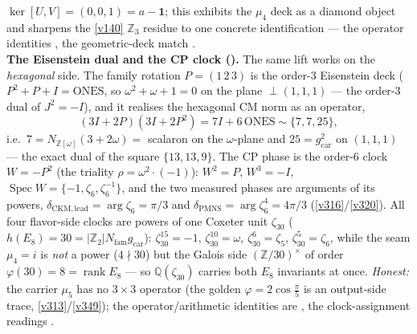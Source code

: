 \documentclass[11pt,a4paper]{article}
\newcommand{\gcar}{g_{\mathrm{car}}}
\newcommand{\Nfam}{N_{\mathrm{fam}}}
\newcommand{\Z}{\mathbb{Z}}
\theoremstyle{definition}
\begin{document}
\begin{keybox}
$\ker[U,V]=(0,0,1)=a-\mathbf 1$; this exhibits the $\mu_4$ deck as a diamond object and sharpens the
\vref{v140} $\Z_3$ residue to one concrete identification --- the operator identities \mE, the
geometric-deck match \mC.
\smallskip\\
\noindent\textbf{The Eisenstein dual and the CP clock ().}
The same lift works on the \emph{hexagonal} side. The family rotation $P=(1\,2\,3)$ is the order-$3$
Eisenstein deck ($P^2+P+I=\mathrm{ONES}$, so $\omega^2+\omega+1=0$ on the plane $\perp(1,1,1)$ --- the
order-$3$ dual of $J^2=-I$), and it realises the hexagonal CM norm as an operator,
\[
  (3I+2P)(3I+2P^2)=7I+6\,\mathrm{ONES}\sim\{7,7,25\},
\]
i.e.\ $7=N_{\Z[\omega]}(3{+}2\omega)=$ scalaron on the $\omega$-plane and $25=\gcar^2$ on $(1,1,1)$ ---
the exact dual of the square $\{13,13,9\}$. The CP phase is the order-$6$ clock $W=-P^2$ (the triality
$\rho=\omega^2{\cdot}({-}1)$): $W^2=P$, $W^3=-I$, $\operatorname{Spec}W=\{-1,\zeta_6,\zeta_6^{-1}\}$, and the
two measured phases are arguments of its powers, $\delta_{\mathrm{CKM,lead}}=\arg\zeta_6=\pi/3$ and
$\delta_{\mathrm{PMNS}}=\arg\zeta_6^4=4\pi/3$ (\vref{v316}/\vref{v320}). All four flavor-side clocks are
powers of one Coxeter unit $\zeta_{30}$ ($h(E_8)=30=|\Z_2|\Nfam\gcar$): $\zeta_{30}^{15}=-1$,
$\zeta_{30}^{10}=\omega$, $\zeta_{30}^{6}=\zeta_5$, $\zeta_{30}^{5}=\zeta_6$, while the seam $\mu_4=i$ is
\emph{not} a power ($4\nmid30$) but the Galois side $(\Z/30)^\times$ of order
$\varphi(30)=8=\operatorname{rank}E_8$ --- so $\mathbb Q(\zeta_{30})$ carries both $E_8$ invariants at
once. \emph{Honest:} the carrier $\mu_5$ has no $3{\times}3$ operator (the golden $\varphi=2\cos\tfrac\pi5$
is an output-side trace, \vref{v313}/\vref{v349}); the operator/arithmetic identities are \mE, the
clock-assignment readings \mC.
\end{keybox}
\end{document}
